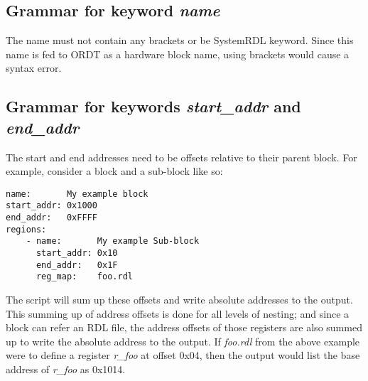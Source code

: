 \documentclass{tropic_design_spec}
\begin{document}
\subsection{Grammar for keyword \textit{name}}

The name must not contain any brackets or be SystemRDL keyword. Since this name is fed
to ORDT as a hardware block name, using brackets would cause a syntax error.

\subsection{Grammar for keywords \textit{start_addr} and \textit{end_addr}}

The start and end addresses need to be offsets relative to their parent block.
For example, consider a block and a sub-block like so:
\begin{lstlisting}
name:       My example block
start_addr: 0x1000
end_addr:   0xFFFF
regions:
    - name:       My example Sub-block
      start_addr: 0x10
      end_addr:   0x1F
      reg_map:    foo.rdl
\end{lstlisting}
The script will sum up these offsets and write absolute addresses to the output.
This summing up of address offsets is done for all levels of nesting; and
since a block can refer an RDL file, the address offsets of those registers are also
summed up to write the absolute address to the output. \newline
If \textit{foo.rdl} from the above example were to define a register \textit{r_foo}
at offset 0x04, then the output would list the base address of \textit{r_foo} as 0x1014.


\pagebreak
\end{document}

